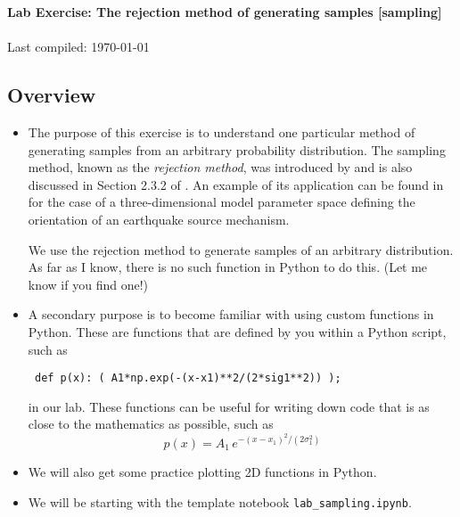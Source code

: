 \documentclass[11pt,titlepage,fleqn]{article}
\begin{document}

\begin{spacing}{1.2}
\centering
{\large \bf Lab Exercise: The rejection method of generating samples [sampling]} \\
\cltag\ \\
Last compiled: \today
\end{spacing}


\subsection*{Overview}

\begin{itemize}
\item The purpose of this exercise is to understand one particular method of generating samples from an arbitrary probability distribution. The sampling method, known as the {\em rejection method}, was introduced by \citet{vonNeumann1951} and is also discussed in Section 2.3.2 of \citet{Tarantola2005}. An example of its application can be found in \citet{SilwalTape2016} for the case of a three-dimensional model parameter space defining the orientation of an earthquake source mechanism.

We use the rejection method to generate samples of an arbitrary distribution. As far as I know, there is no such function in Python to do this. (Let me know if you find one!)

\item A secondary purpose is to become familiar with using custom functions in Python. These are functions that are defined by you within a Python script, such as

\verb+ def p(x): ( A1*np.exp(-(x-x1)**2/(2*sig1**2)) );+

in our lab. These functions can be useful for writing down code that is as close to the mathematics as possible, such as
%
\begin{equation}
p(x) = A_1\,e^{-(x-x_1)^2/(2\sigma_1^2)}
\end{equation}

\item We will also get some practice plotting 2D functions in Python.

\item We will be starting with the template notebook \verb+lab_sampling.ipynb+.

%

\end{itemize}
\end{document}
